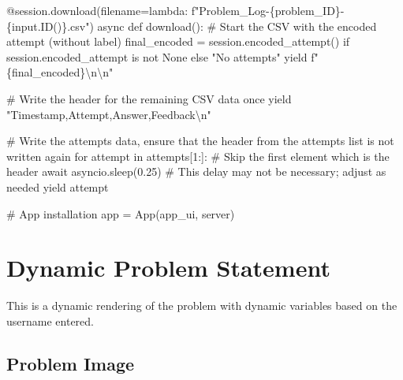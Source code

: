 \documentclass[
  letterpaper,
  DIV=11,
  numbers=noendperiod]{scrreprt}
\newenvironment{Shaded}{\begin{snugshade}}{\end{snugshade}}
\newcommand{\NormalTok}[1]{\textcolor[rgb]{0.00,0.23,0.31}{#1}}
\begin{document}
\begin{Shaded}
\begin{Highlighting}[]
\NormalTok{    @session.download(filename=lambda: f"Problem\_Log{-}\{problem\_ID\}{-}\{input.ID()\}.csv")}
\NormalTok{    async def download():}
\NormalTok{        \# Start the CSV with the encoded attempt (without label)}
\NormalTok{        final\_encoded = session.encoded\_attempt() if session.encoded\_attempt is not None else "No attempts"}
\NormalTok{        yield f"\{final\_encoded\}\textbackslash{}n\textbackslash{}n"}
        
\NormalTok{        \# Write the header for the remaining CSV data once}
\NormalTok{        yield "Timestamp,Attempt,Answer,Feedback\textbackslash{}n"}
        
\NormalTok{        \# Write the attempts data, ensure that the header from the attempts list is not written again}
\NormalTok{        for attempt in attempts[1:]:  \# Skip the first element which is the header}
\NormalTok{            await asyncio.sleep(0.25)  \# This delay may not be necessary; adjust as needed}
\NormalTok{            yield attempt}


\NormalTok{\# App installation}
\NormalTok{app = App(app\_ui, server)}
\end{Highlighting}
\end{Shaded}

\chapter*{Dynamic Problem Statement}\label{dynamic-problem-statement-1}


This is a dynamic rendering of the problem with dynamic variables based
on the username entered.

\section*{Problem Image}\label{problem-image-22}

\end{document}
